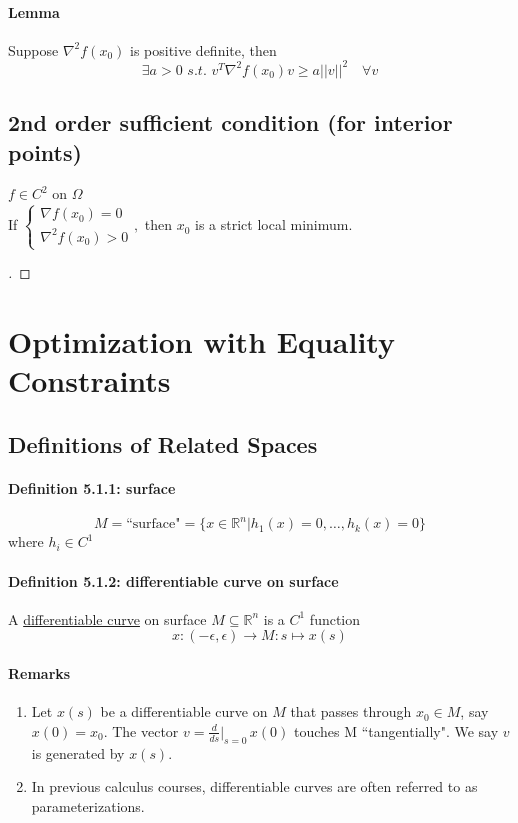 \documentclass[11pt]{article}
\newcommand{\real}[0]{\mathbb{R}}
\newcommand{\under}[1]{\underline{#1}}
\begin{document}
\paragraph{Lemma}
Suppose $\nabla^2 f(x_0)$ is positive definite, then
$$\exists a > 0 \,\, s.t. \,\, v^T\nabla^2f(x_0)v \geq a||v||^2 \quad \forall v$$


\subsection{2nd order sufficient condition (for interior points)}
$f \in C^2$ on $\Omega$ \\
If $\begin{cases}
	\nabla f(x_0) = 0 \\
	\nabla^2 f(x_0) > 0
\end{cases},$ then $x_0$ is a strict local minimum. \\
\begin{proof}
	[ ]
\end{proof}


\section{Optimization with Equality Constraints}

\subsection{Definitions of Related Spaces}
\paragraph{Definition 5.1.1: surface}
$$M =  \text{``surface"}  = \{ x \in \real^n | h_1(x) = 0, \hdots, h_k(x) = 0\}$$ 
where $h_i \in C^1$

\paragraph{Definition 5.1.2: differentiable curve on surface}
A \under{differentiable curve} on surface $M \subseteq \real^n$ is a $C^1$ function
$$ x: (-\epsilon, \epsilon) \rightarrow M: s \mapsto x(s)$$ 
\paragraph{Remarks}
\begin{enumerate}
	\item Let $x(s)$ be a differentiable curve on $M$ that passes through $x_0 \in M$, say $x(0) = x_0$. The vector $v = \frac{d}{ds}|_{s=0} \, x(0)$ touches M ``tangentially". We say $v$ is generated by $x(s)$.
	\item In previous calculus courses, differentiable curves are often referred to as parameterizations.
\end{enumerate}
\end{document}
